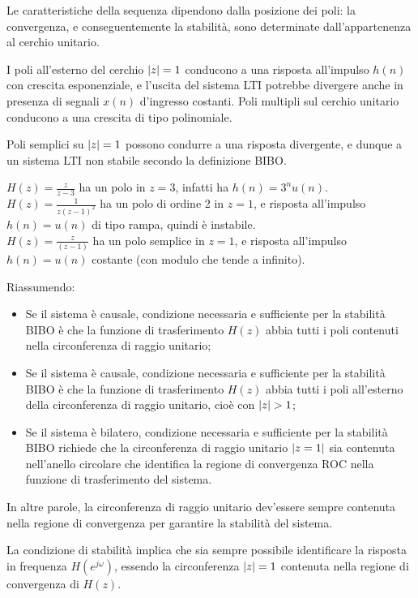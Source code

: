 Le caratteristiche della sequenza dipendono dalla posizione dei poli: la convergenza, e conseguentemente la stabilità, sono determinate dall'appartenenza al cerchio unitario.

I poli all'esterno del cerchio $\left|z\right| = 1$ conducono a una risposta all'impulso $h(n)$ con crescita esponenziale, e l'uscita del sistema LTI potrebbe divergere anche in presenza di segnali $x(n)$ d'ingresso costanti. Poli multipli sul cerchio unitario conducono a una crescita di tipo polinomiale.

Poli semplici su $\left|z\right| = 1$ possono condurre a una risposta divergente, e dunque a un sistema LTI non stabile secondo la definizione BIBO.

$H(z) = \frac{z}{z-3}$ ha un polo in $z = 3$, infatti ha $h(n) = 3^nu(n)$. \\
$H(z) = \frac{1}{z(z-1)^2}$ ha un polo di ordine 2 in $z = 1$, e risposta all'impulso $h(n) = u(n)$ di tipo rampa, quindi è instabile. \\
$H(z) = \frac{z}{(z-1)}$ ha un polo semplice in $z = 1$, e risposta all'impulso $h(n) = u(n)$ costante (con modulo che tende a infinito).

Riassumendo:
\begin{itemize}
	\item Se il sistema è causale, condizione necessaria e sufficiente per la stabilità BIBO è che la funzione di trasferimento $H(z)$ abbia tutti i poli contenuti nella circonferenza di raggio unitario;
	\item Se il sistema è causale, condizione necessaria e sufficiente per la stabilità BIBO è che la funzione di trasferimento $H(z)$ abbia tutti i poli all'esterno della circonferenza di raggio unitario, cioè con $\left|z\right| > 1$;
	\item Se il sistema è bilatero, condizione necessaria e sufficiente per la stabilità BIBO richiede che la circonferenza di raggio unitario $\left|z = 1\right|$ sia contenuta nell'anello circolare che identifica la regione di convergenza ROC nella funzione di trasferimento del sistema.
\end{itemize}

In altre parole, la circonferenza di raggio unitario dev'essere sempre contenuta nella regione di convergenza per garantire la stabilità del sistema. 

La condizione di stabilità implica che sia sempre possibile identificare la risposta in frequenza $H(e^{j\omega})$, essendo la circonferenza $\left|z\right| = 1$ contenuta nella regione di convergenza di $H(z)$.

